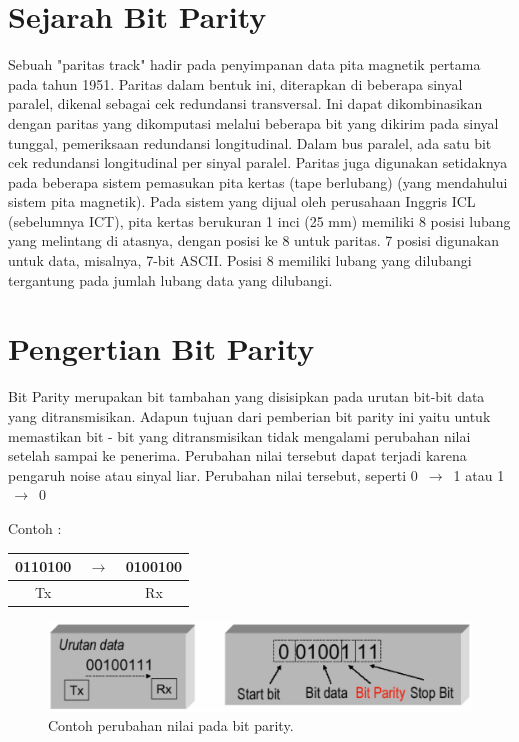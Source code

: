 ﻿%

\section{Sejarah Bit Parity}
Sebuah "paritas track" hadir pada penyimpanan data pita magnetik pertama pada tahun 1951. Paritas dalam bentuk ini, diterapkan di beberapa sinyal paralel, dikenal sebagai cek redundansi transversal. Ini dapat dikombinasikan dengan paritas yang dikomputasi melalui beberapa bit yang dikirim pada sinyal tunggal, pemeriksaan redundansi longitudinal. Dalam bus paralel, ada satu bit cek redundansi longitudinal per sinyal paralel. Paritas juga digunakan setidaknya pada beberapa sistem pemasukan pita kertas (tape berlubang) (yang mendahului sistem pita magnetik). Pada sistem yang dijual oleh perusahaan Inggris ICL (sebelumnya ICT), pita kertas berukuran 1 inci (25 mm) memiliki 8 posisi lubang yang melintang di atasnya, dengan posisi ke 8 untuk paritas. 7 posisi digunakan untuk data, misalnya, 7-bit ASCII. Posisi 8 memiliki lubang yang dilubangi tergantung pada jumlah lubang data yang dilubangi.


\section{Pengertian Bit Parity}
Bit Parity merupakan bit tambahan yang disisipkan pada urutan bit-bit data yang ditransmisikan. Adapun tujuan dari pemberian bit parity ini yaitu untuk memastikan bit - bit yang ditransmisikan tidak mengalami perubahan nilai setelah sampai ke penerima. Perubahan nilai tersebut dapat terjadi karena pengaruh noise atau sinyal liar.
Perubahan nilai tersebut, seperti 0 $\,\to\,$ 1 atau 1 $\,\to\,$ 0

Contoh :

\begin{table}[h!]
\centering
\begin{tabular}{ c c c }
0110100 & $\,\to\,$ &  0100100\\
\hline
Tx &  & Rx \\
\end{tabular}
\end{table}

\begin{figure}[ht]
\centerline{\includegraphics[width=1\textwidth]{figures/perubahan_nilai_bit_parity.png}}
\caption{Contoh perubahan nilai pada bit parity.}
\label{perubahan_nilai_bit_parity}
\end{figure}

